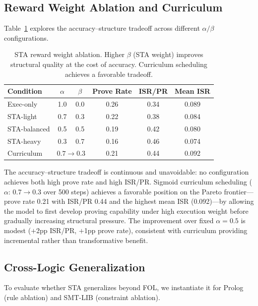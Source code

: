 \documentclass[11pt,a4paper]{article}
\begin{document}
\subsection{Reward Weight Ablation and Curriculum}

Table~\ref{tab:weight_ablation} explores the accuracy--structure tradeoff across different $\alpha/\beta$ configurations.

\begin{table}[t]
\centering
\small
\caption{STA reward weight ablation. Higher $\beta$ (STA weight) improves structural quality at the cost of accuracy. Curriculum scheduling achieves a favorable tradeoff.}
\label{tab:weight_ablation}
\begin{tabular}{lccccc}
\toprule
Condition & $\alpha$ & $\beta$ & Prove Rate & ISR/PR & Mean ISR \\
\midrule
Exec-only      & 1.0 & 0.0 & 0.26 & 0.34 & 0.089 \\
STA-light      & 0.7 & 0.3 & 0.22 & 0.38 & 0.084 \\
STA-balanced   & 0.5 & 0.5 & 0.19 & 0.42 & 0.080 \\
STA-heavy      & 0.3 & 0.7 & 0.16 & 0.46 & 0.074 \\
Curriculum     & \multicolumn{2}{c}{$0.7{\to}0.3$} & 0.21 & 0.44 & 0.092 \\
\bottomrule
\end{tabular}
\end{table}

The accuracy--structure tradeoff is continuous and unavoidable: no configuration achieves both high prove rate and high ISR/PR.
Sigmoid curriculum scheduling ($\alpha$: 0.7$\to$0.3 over 500 steps) achieves a favorable position on the Pareto frontier---prove rate 0.21 with ISR/PR 0.44 and the highest mean ISR (0.092)---by allowing the model to first develop proving capability under high execution weight before gradually increasing structural pressure.
The improvement over fixed $\alpha=0.5$ is modest ($+$2pp ISR/PR, $+$1pp prove rate), consistent with curriculum providing incremental rather than transformative benefit.

\subsection{Cross-Logic Generalization}
\label{sec:crosslogic}

To evaluate whether STA generalizes beyond FOL, we instantiate it for Prolog (rule ablation) and SMT-LIB (constraint ablation).
\end{document}
